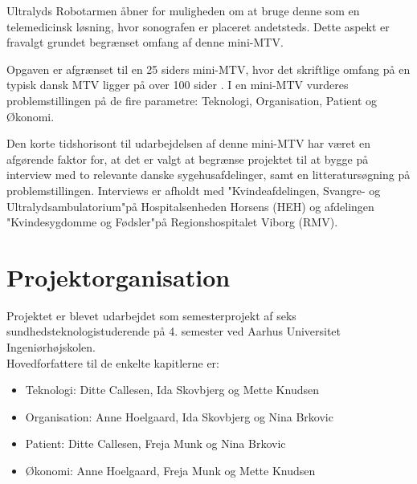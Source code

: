Ultralyds Robotarmen åbner for muligheden om at bruge denne som en telemedicinsk løsning, hvor sonografen er placeret andetsteds. Dette aspekt er fravalgt grundet begrænset omfang af denne mini-MTV. 

Opgaven er afgrænset til en 25 siders mini-MTV, hvor det skriftlige omfang på en typisk dansk MTV ligger på over 100 sider \cite{Leavitt}. I en mini-MTV vurderes problemstillingen på de fire parametre: Teknologi, Organisation, Patient og Økonomi. 

Den korte tidshorisont til udarbejdelsen af denne mini-MTV har været en afgørende faktor for, at det er valgt at begrænse projektet til at bygge på interview med to relevante danske sygehusafdelinger, samt en litteratursøgning på problemstillingen. Interviews er afholdt med "Kvindeafdelingen, Svangre- og Ultralydsambulatorium"\space på Hospitalsenheden Horsens (HEH) og afdelingen "Kvindesygdomme og Fødsler"\space på Regionshospitalet Viborg (RMV).

\section{Projektorganisation}
Projektet er blevet udarbejdet som semesterprojekt af seks sundhedsteknologistuderende på 4. semester ved Aarhus Universitet Ingeniørhøjskolen. \\
Hovedforfattere til de enkelte kapitlerne er:
\begin{itemize}
\item Teknologi: Ditte Callesen, Ida Skovbjerg og  Mette Knudsen
\item Organisation: Anne Hoelgaard, Ida Skovbjerg og Nina Brkovic
\item Patient: Ditte Callesen, Freja Munk og Nina Brkovic
\item Økonomi: Anne Hoelgaard, Freja Munk og Mette Knudsen
\end{itemize}

\label{version_Systemark}
